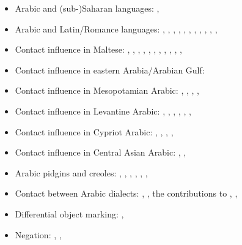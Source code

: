 \documentclass[output=paper]{langsci/langscibook}
\begin{document}
\begin{itemize}[noitemsep]
\item[]Arabic and (sub-)Saharan languages: \citet{Owens2000article,Owens2015,Owens2016idioms}, \citet{OwensHassan2004} \citet{Souag2013lexical,Souag2016sahara}

\item[]Arabic and Latin/Romance languages: \citet{Brunot1949}, \citet{Benoliel1977}, \citet{Corriente1978,Corriente1992chapter,Corriente1992book,Corriente1995,Corriente2000,Corriente2005,Corriente2008}, \citet{Talmoudi1986}, \citet{Abdu1988}, \citet{Heath1989,Heath1999,Heath2015}, \citet{Cifoletti1994}, \citet{Ferrando1995,Ferrando1997}, \citet{OuldMohamedBaba2003}, \citet{Vicente2006},
\citet{Sayahi2011,Sayahi2014,Sayahi2015}, \citet{Danna2018phonetic}

\item[]Contact influence in Maltese: \citet{colin1957}, \citet{Aquilina1958}, \citet{krier1976}, \citet{Drewes1994}, \citet{mifsudloanverbs}, \citet{stolz2003}, \citet{vella2003}, \citet{bovingdondalli2006}, \citet{brincat1996,brincat2011}, \citet{comriespagnol2016}, \citet{dohla2016}, \citet{Souag2018berber}

\item[]Contact influence in eastern Arabia/Arabian Gulf: \citet{Holes2002}

\item[]Contact influence in Mesopotamian Arabic: \citet{Masliyah1996,Masliyah1997}, \citet{Ingham2005}, \citet{Shabibi2006}, \citet{MatrasShabibi2007}, \citet{ElZarkaZiagos2019}

\item[]Contact influence in Levantine Arabic: \citet{Barbot1961}, \citet{Halasi-Kun1969,Halasi-Kun1973,Halasi-Kun1982}, \citet{Hopkins1995}, \citet{Contini1999}, \citet{Horesh2015}, \citet{Neishtadt2015}, 

\item[]Contact influence in Cypriot Arabic: \citet{Newton1964}, \citet{Tsiapera1964}, \citet{Borg1985,Borg1997CMA,Borg2004}, \citet{Roth2004}, \citet{Gulle2016} 

\item[]Contact influence in Central Asian Arabic: \citet{Ratcliffe2005}, \citet{Ingham2011afg}, \citet{Jastrow2005}

\item[]Arabic pidgins and creoles: \citet{Owens1985}, \citet{BurengVincent1986}, \citet{Miller1989,Miller1993}, \citet{Nakao2012}, \citet{Luffin2014}, \citet{Manfredi2014relex}, \citet{Avram2017article,Avram2019} \citet{Bizri2018}

\item[]Contact between Arabic dialects: \citet{Behnstedt1994Dialektkontakt}, \citet{Gibson2002}, the contributions to \citet{Miller2007}, \citet{Palva2009}, \citet{Vicente2010}

\item[]Differential object marking: \citet{Coghill2014}, \citet{Souag2017clitic}

\item[]Negation: \citet{Lucas2007,Lucas2012,Lucas2013}, \citet{LucasLash2010}, \citet{BreitbarthWillisLucasinpress}


\end{itemize}
\end{document}
